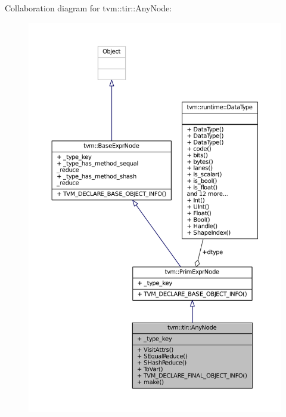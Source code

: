 Collaboration diagram for tvm\+:\+:tir\+:\+:Any\+Node\+:
\nopagebreak
\begin{figure}[H]
\begin{center}
\leavevmode
\includegraphics[width=350pt]{classtvm_1_1tir_1_1AnyNode__coll__graph}
\end{center}
\end{figure}

